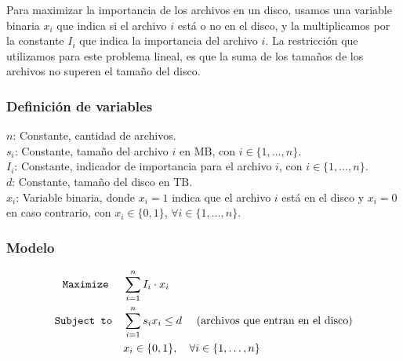 \documentclass[11pt, a4paper, pdftex]{article}
\begin{document}
Para maximizar la importancia de los archivos en un disco, usamos una
variable binaria $x_i$ que indica si el archivo $i$ está o no en el
disco, y la multiplicamos por la constante $I_{i}$ que indica la
importancia del archivo $i$. La restricción que utilizamos para este
problema lineal, es que la suma de los tamaños de los archivos no superen
el tamaño del disco. 

\subsubsection{Definición de variables}


\noindent $n$: Constante, cantidad de archivos. \\

\noindent $s_{i}$: Constante, tamaño del archivo $i$ en $\text{MB}$, con $i \in \{1, \ldots, n\}$. \\

\noindent $I_{i}$: Constante, indicador de importancia para el archivo $i$, con $i \in \{1, \ldots, n\}$. \\

\noindent $d$: Constante, tamaño del disco en $\text{TB}$. \\

\noindent $x_{i}$: Variable binaria, donde $x_{i} = 1$ indica que el archivo $i$ está en el disco y $x_{i} = 0$ en caso contrario, con $x_{i} \in \{0, 1\}$, $\forall i \in \{1, \ldots, n\}$. \\


\subsubsection{Modelo}

\begin{alignat*}{2}
	\texttt{Maximize}\quad\,\,
	& \sum_{i = 1}^{n} I_{i} \cdot x_{i}\\
	\texttt{Subject to}\quad
	& \sum_{i = 1}^{n} s_{i} x_{i} \le d\ \quad\text{(archivos que entran en el disco)}\\
	& x_{i} \in \{0,1\}, \quad \forall i \in \{1, \ldots, n\} \\
\end{alignat*}
\end{document}
